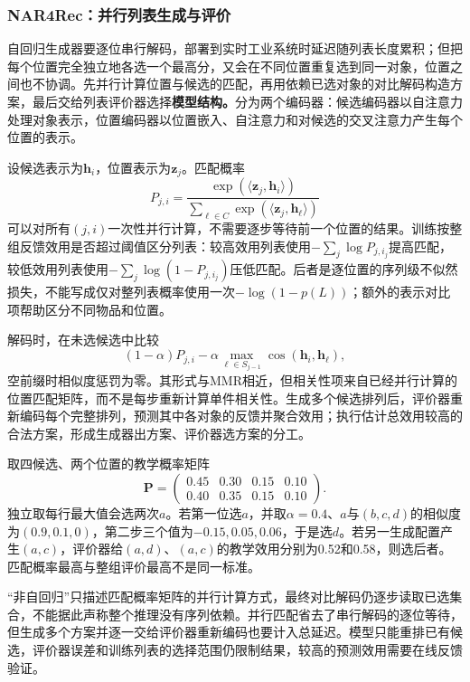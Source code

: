 \subsubsection{NAR4Rec：并行列表生成与评价}
\label{sec:rs-nar4rec}

自回归生成器要逐位串行解码，部署到实时工业系统时延迟随列表长度累积；但把每个位置完全独立地各选一个最高分，又会在不同位置重复选到同一对象，位置之间也不协调。先并行计算位置与候选的匹配，再用依赖已选对象的对比解码构造方案，最后交给列表评价器选择\textbf{模型结构。}分为两个编码器：候选编码器以自注意力处理对象表示，位置编码器以位置嵌入、自注意力和对候选的交叉注意力产生每个位置的表示。

设候选表示为$\bm h_i$，位置表示为$\bm z_j$。匹配概率
\[
 P_{j,i}=\frac{\exp(\langle\bm z_j,\bm h_i\rangle)}
                  {\sum_{\ell\in C}\exp(\langle\bm z_j,\bm h_\ell\rangle)}
\]
可以对所有$(j,i)$一次性并行计算，不需要逐步等待前一个位置的结果。训练按整组反馈效用是否超过阈值区分列表：较高效用列表使用$-\sum_j\log P_{j,i_j}$提高匹配，较低效用列表使用$-\sum_j\log(1-P_{j,i_j})$压低匹配。后者是逐位置的序列级不似然损失，不能写成仅对整列表概率使用一次$-\log(1-p(L))$；额外的表示对比项帮助区分不同物品和位置。

解码时，在未选候选中比较
\[
 (1-\alpha)P_{j,i}
 -\alpha\max_{\ell\in S_{j-1}}
       \operatorname{cos}(\bm h_i,\bm h_\ell),
\]
空前缀时相似度惩罚为零。其形式与MMR相近，但相关性项来自已经并行计算的位置匹配矩阵，而不是每步重新计算单件相关性。生成多个候选排列后，评价器重新编码每个完整排列，预测其中各对象的反馈并聚合效用；执行估计总效用较高的合法方案，形成生成器出方案、评价器选方案的分工。

取四候选、两个位置的教学概率矩阵
\[
 \bm P=
 \begin{pmatrix}
  0.45&0.30&0.15&0.10\\
  0.40&0.35&0.15&0.10
 \end{pmatrix}.
\]
独立取每行最大值会选两次$a$。若第一位选$a$，并取$\alpha=0.4$、$a$与$(b,c,d)$的相似度为$(0.9,0.1,0)$，第二步三个值为$-0.15,0.05,0.06$，于是选$d$。若另一生成配置产生$(a,c)$，评价器给$(a,d)$、$(a,c)$的教学效用分别为0.52和0.58，则选后者。匹配概率最高与整组评价最高不是同一标准。

“非自回归”只描述匹配概率矩阵的并行计算方式，最终对比解码仍逐步读取已选集合，不能据此声称整个推理没有序列依赖。并行匹配省去了串行解码的逐位等待，但生成多个方案并逐一交给评价器重新编码也要计入总延迟。模型只能重排已有候选，评价器误差和训练列表的选择范围仍限制结果，较高的预测效用需要在线反馈验证。

